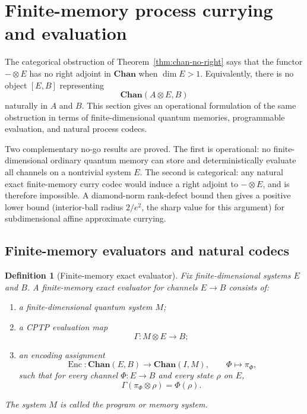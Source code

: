 \documentclass[11pt]{article}
\newtheorem{definition}[theorem]{Definition}
\begin{document}
\section{Finite-memory process currying and evaluation}
\label{sec:finite-memory}

The categorical obstruction of Theorem~\ref{thm:chan-no-right} says that the
functor $-\otimes E$ has no right adjoint in $\mathbf{Chan}$ when
$\dim E>1$. Equivalently, there is no object $[E,B]$ representing
\[
\mathbf{Chan}(A\otimes E,B)
\]
naturally in $A$ and $B$. This section gives an operational formulation of
the same obstruction in terms of finite-dimensional quantum memories,
programmable evaluation, and natural process codecs.

Two complementary no-go results are proved. The first is operational: no
finite-dimensional ordinary quantum memory can store and deterministically
evaluate all channels on a nontrivial system $E$. The second is categorical:
any natural exact finite-memory curry codec would induce a right adjoint to
$-\otimes E$, and is therefore impossible. A diamond-norm rank-defect bound
then gives a positive lower bound (interior-ball radius $2/e^2$, the sharp value
for this argument) for subdimensional affine approximate currying.

\subsection{Finite-memory evaluators and natural codecs}

\begin{definition}[Finite-memory exact evaluator]
\label{def:finite-memory-evaluator}
Fix finite-dimensional systems $E$ and $B$. A
\emph{finite-memory exact evaluator} for channels $E\to B$ consists of:
\begin{enumerate}
\item a finite-dimensional quantum system $M$;
\item a CPTP evaluation map
\[
\Gamma:M\otimes E\longrightarrow B;
\]
\item an encoding assignment
\[
\operatorname{Enc}:
\mathbf{Chan}(E,B)
\longrightarrow
\mathbf{Chan}(I,M),
\qquad
\Phi\longmapsto \pi_\Phi,
\]
such that for every channel $\Phi:E\to B$ and every state $\rho$ on $E$,
\[
\Gamma(\pi_\Phi\otimes\rho)=\Phi(\rho).
\]
\end{enumerate}
The system $M$ is called the program or memory system.
\end{definition}
\end{document}
